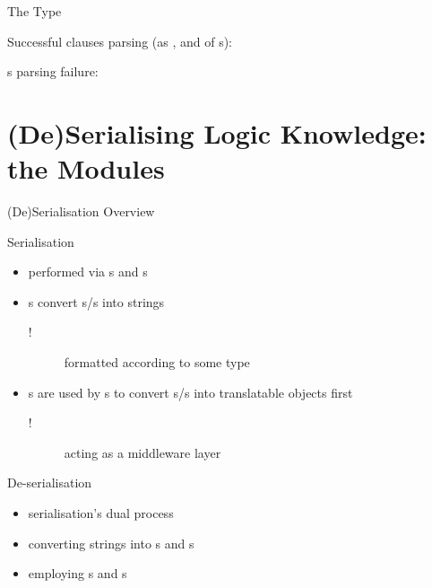 \documentclass[handout]{beamer}
\begin{document}
\begin{frame}[allowframebreaks]{The  Type}
    \framebreak

    Successful clauses parsing (as ,  and  of s):

    \framebreak

    s parsing failure:

\end{frame}

\section{(De)Serialising Logic Knowledge: the  Modules}

\begin{frame}[allowframebreaks]{(De)Serialisation Overview}

    \begin{block}{Serialisation}
        \begin{itemize}
            \item performed via s and s
            \item {}s convert s/s into strings
            \begin{description}
                \item[!] formatted according to some  type 
            \end{description}
            \item {}s are used by s to convert s/s into translatable objects first
            \begin{description}
                \item[!] acting as a middleware layer 
            \end{description}
        \end{itemize}
    \end{block}
    \begin{block}{De-serialisation}
        \begin{itemize}
            \item serialisation's dual process
            \item converting strings into s and s
            \item employing s and s
        \end{itemize}
    \end{block}


\end{frame}
\end{document}
